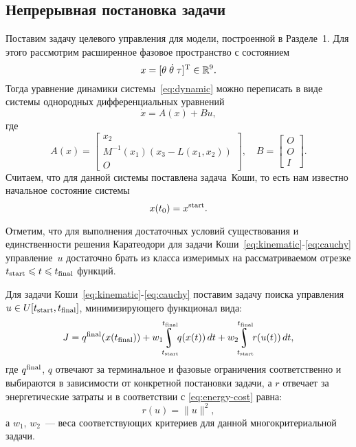 \documentclass[../../doc.tex]{subfiles}
\begin{document}
    \subsection{Непрерывная постановка задачи}
    
    Поставим задачу целевого управления для модели, построенной в Разделе~1.
    Для этого рассмотрим расширенное фазовое пространство с состоянием
    \begin{equation*}
        x = [\theta\;\dot\theta\;\tau]^\textnormal{T} \in \mathbb{R}^9.
    \end{equation*}
    Тогда уравнение динамики системы~\eqref{eq:dynamic} можно переписать в виде системы однородных дифференциальных уравнений
    \begin{equation}\label{eq:kinematic}
        \dot x = A(x) + Bu,
    \end{equation}
    где 
    $$
        A(x) = \begin{bmatrix}
            x_2 \\
            M^{-1}(x_1)(x_3 - L(x_1, x_2)) \\
            O
        \end{bmatrix}
        ,\quad
        B = \begin{bmatrix}
            O \\
            O \\
            I
        \end{bmatrix}.
    $$
    Считаем, что для данной системы поставлена задача~Коши, то есть нам известно начальное состояние системы
    \begin{equation}\label{eq:cauchy}
        x(t_0) = x^{\textnormal{start}}.
    \end{equation}

    \begin{remark}
        Отметим, что для выполнения достаточных условий существования и единственности решения Каратеодори для задачи Коши~\eqref{eq:kinematic}-\eqref{eq:cauchy} управление~$u$ достаточно брать из класса измеримых на рассматриваемом отрезке $t_{\textnormal{start}}\leqslant t \leqslant t_{\textnormal{final}}$ функций.
    \end{remark}

    Для задачи Коши~\eqref{eq:kinematic}-\eqref{eq:cauchy} поставим задачу поиска управления $u \in U[t_{\textnormal{start}},t_{\textnormal{final}}]$, минимизирующего функционал вида:
    \begin{equation}\label{eq:continuos-cost}
        J = q^{\textnormal{final}}(x(t_{\textnormal{final}})) + w_1 \!\! \uint\limits_{t_{\textnormal{start}}}^{t_{\textnormal{final}}} \!\! q(x(t))\,dt + w_2 \!\! \uint\limits_{t_{\textnormal{start}}}^{t_{\textnormal{final}}} \!\! r(u(t))\,dt,
    \end{equation}
    где $q^{\textnormal{final}}$, $q$ отвечают за терминальное и фазовые ограничения соответственно и выбираются в зависимости от конкретной постановки задачи, а $r$ отвечает за энергетические затраты и в соответствии с \eqref{eq:energy-cost} равна:
    $$
        r(u) = \|u\|^2,
    $$
    а $w_1$, $w_2$~--- веса соответствующих критериев для данной многокритериальной задачи.
\end{document}
